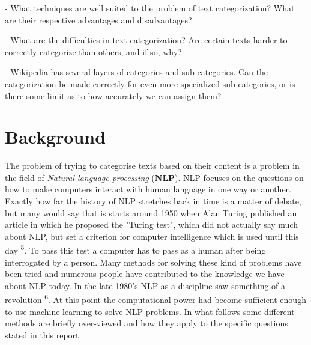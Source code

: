\documentclass[a4paper]{article}
\begin{document}
\vspace{3mm}

- What techniques are well suited to the problem of text categorization? What are their respective advantages and disadvantages?

\vspace{3mm}

- What are the difficulties in text categorization? Are certain texts harder to correctly categorize than others, and if so, why?

\vspace{3mm}

- Wikipedia has several layers of categories and sub-categories. Can the categorization be made correctly for even more specialized sub-categories, or is there some limit as to how accurately we can assign them?


\vspace{3mm}


\section*{Background}

\vspace{3mm}

The problem of trying to categorise texts based on their content is a problem in the field of \textit{Natural language processing} (\textbf{NLP}). NLP focuses on the questions on how to make computers interact with human language in one way or another.\\

Exactly how far the history of NLP stretches back in time is a matter of debate, but many would say that is starts around 1950 when Alan Turing published an article in which he proposed the "Turing test", which did not actually say much about NLP, but set a criterion for computer intelligence which is used until this day \textsuperscript{5}. To pass this test a computer has to pass as a human after being interrogated by a person. Many methods for solving these kind of problems have been tried and numerous people have contributed to the knowledge we have about NLP today. In the late 1980's NLP as a discipline saw something of a revolution \textsuperscript{6}. At this point the computational power had become sufficient enough to use machine learning to solve NLP problems. In what follows some different methods are briefly over-viewed and how they apply to the specific questions stated in this report.\\
\end{document}
